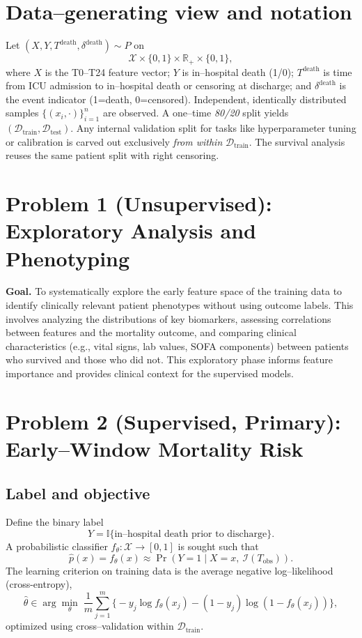 \section{Data–generating view and notation}
Let $(X,Y,T^{\mathrm{death}},\delta^{\mathrm{death}})\sim P$ on
\[
\mathcal{X}\times\{0,1\}\times\mathbb{R}_+\times\{0,1\},
\]
where $X$ is the T0--T24 feature vector; $Y$ is in–hospital death (1/0); $T^{\mathrm{death}}$ is time from ICU admission to in–hospital death or censoring at discharge; and $\delta^{\mathrm{death}}$ is the event indicator (1=death, 0=censored). Independent, identically distributed samples $\{(x_i,\cdot)\}_{i=1}^n$ are observed. A one–time \emph{80/20} split yields $(\mathcal{D}_{\mathrm{train}},\mathcal{D}_{\mathrm{test}})$. Any internal validation split for tasks like hyperparameter tuning or calibration is carved out exclusively \emph{from within} $\mathcal{D}_{\mathrm{train}}$. The survival analysis reuses the same patient split with right censoring.

\section{Problem 1 (Unsupervised): Exploratory Analysis and Phenotyping}
\textbf{Goal.} To systematically explore the early feature space of the training data to identify clinically relevant patient phenotypes without using outcome labels. This involves analyzing the distributions of key biomarkers, assessing correlations between features and the mortality outcome, and comparing clinical characteristics (e.g., vital signs, lab values, SOFA components) between patients who survived and those who did not. This exploratory phase informs feature importance and provides clinical context for the supervised models.

\section{Problem 2 (Supervised, Primary): Early–Window Mortality Risk}
\subsection{Label and objective}
Define the binary label
\[
Y=\mathbb{I}\{\text{in–hospital death prior to discharge}\}.
\]
A probabilistic classifier $f_{\theta}:\mathcal{X}\to[0,1]$ is sought such that
\[
\hat p(x)=f_{\theta}(x)\approx \Pr(Y=1\mid X=x,\ \mathcal{I}(T_{\mathrm{obs}})).
\]
The learning criterion on training data is the average negative log–likelihood (cross-entropy),
\[
\hat\theta\in\arg\min_{\theta}\;\frac{1}{m}\sum_{j=1}^{m}
\big\{-y_j\log f_{\theta}(x_j)-(1-y_j)\log(1-f_{\theta}(x_j))\big\},
\]
optimized using cross–validation within $\mathcal{D}_{\mathrm{train}}$.

